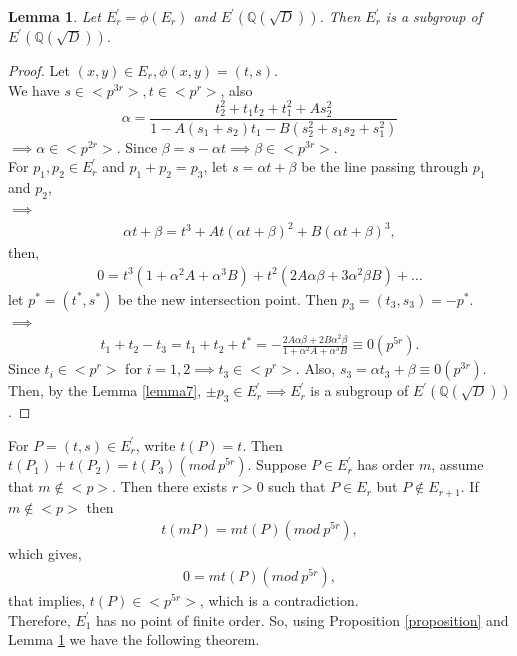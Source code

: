 \documentclass[12pt,leqno]{amsart}
\newcommand{\<}{\langle}
\renewcommand{\>}{\rangle}
\newtheorem{lemma}{Lemma}
\theoremstyle{definition}
\numberwithin{equation}{section}
\begin{document}
\begin{lemma}\label{lemma12}
    Let $E_r^{'}=\phi(E_r)$ and $E^{'}(\mathbb Q(\sqrt{D}))$. Then $E_r^{'}$ is a subgroup of $E^{'}(\mathbb Q(\sqrt{D}))$.
\end{lemma}
\begin{proof}
    Let $(x,y)\in E_r,\phi(x,y)=(t,s)$.\\
    We have $s\in <p^{3r}>,t\in <p^r>$, also 
    \begin{equation*}
        \alpha=\frac{t_2^2+t_1 t_2+t_1^2+As_2^2}{1-A(s_1+s_2)t_1-B(s_2^2+s_1s_2+s_1^2)}
    \end{equation*}
    $\implies \alpha\in <p^{2r}>$.
    Since $\beta=s-\alpha t\implies \beta\in<p^{3r}>$.\\
For $p_1,p_2\in E_r^{'}$ and $p_1+p_2=p_3$, let $s=\alpha t+\beta$ be the line passing through $p_1$ and $p_2$,\\ $\implies$
    \begin{align*}
        \alpha t+\beta=t^3+At(\alpha t+\beta)^2+B(\alpha t+\beta)^3,
    \end{align*}
    then,
    \begin{align*}
        0=t^3(1+\alpha^2 A+\alpha^3 B)+t^2(2A\alpha \beta+3\alpha^2\beta B)+\ldots
    \end{align*}
    let $p^*=(t^*,s^*)$ be the new intersection point. Then $p_3=(t_3,s_3)=-p^*$.\\$\implies$
    \begin{align*}
        t_1+t_2-t_3=t_1+t_2+t^*=-\frac{2A\alpha\beta+2B\alpha^2\beta}{1+\alpha^2A+\alpha^3 B}\equiv 0(p^{5r}).
    \end{align*}
    Since $t_i\in <p^r>$ for $i=1,2\implies  t_3\in<p^r>$. Also, $s_3=\alpha t_3+\beta\equiv 0(p^{3r})$. Then, by the Lemma \ref{lemma7}, $\pm p_3\in E_r^{'}\implies E_r^{'}$ is a subgroup of $E^{'}(\mathbb Q(\sqrt{D}))$.
 \end{proof} 

    For $P=(t,s)\in E_r^'$, write $t(P)=t$. Then $t(P_1)+t(P_2)=t(P_3)(mod~p^{5r})$. Suppose $P\in E_r^'$ has order $m$, assume that $m\notin <p>$. Then there exists $r>0$ such that $P\in E_r$ but $P\notin E_{r+1}$. If $m\notin<p>$ then
    \begin{align*}
        t(mP)=mt(P)(mod~p^{5r}),
    \end{align*}
    which gives,
    \begin{align*}
        0=mt(P)(mod~p^{5r}),
    \end{align*}
    that implies, $t(P)\in <p^{5r}>$, which is a contradiction.\\
    Therefore, $E_1^'$ has no point of finite order. So, using Proposition \ref{proposition} and Lemma \ref{lemma12} we have the following theorem.
\end{document}
